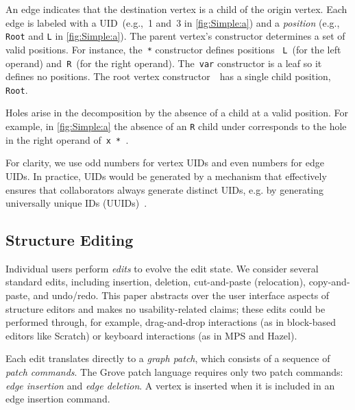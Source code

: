 An edge indicates that the destination vertex is a child of the origin vertex. 
Each edge is labeled with a UID~(e.g.,~1 and~3 in \autoref{fig:Simple:a})
and a \emph{position} (e.g., \texttt{Root} and \texttt{L} in \autoref{fig:Simple:a}). 
The parent vertex's constructor determines a set of valid {positions}. 
For instance, the~\texttt{*} constructor defines positions
~\texttt{L}~(for the left operand)
and~\texttt{R}~(for the right operand).
The~\texttt{var} constructor is a leaf so it defines no positions.
The root vertex constructor~\textbullet~has a single child position, \texttt{Root}.


Holes arise in the decomposition by the absence of a child at a valid position.
For example, in \autoref{fig:Simple:a} the absence of an \texttt{R} child under \vSimpleTimes{}
corresponds to the hole in the right operand of~\texttt{x * \hole}.

For clarity, we use odd numbers for vertex UIDs and even numbers for edge UIDs. In practice, UIDs would be generated by a mechanism
that effectively ensures that collaborators always generate distinct UIDs, e.g. by generating
universally unique IDs (UUIDs)~\cite{paskin1999toward}.


\subsection{Structure Editing}%
\label{sub:Single-User Actions}
\figureWrapMove

Individual users perform \emph{edits} to evolve the edit state. We consider several standard edits, including insertion, deletion, cut-and-paste (relocation), copy-and-paste, and undo/redo. This paper abstracts over the user interface aspects of structure editors and makes no usability-related claims; these edits could be performed through, for example, drag-and-drop interactions (as in block-based editors like Scratch) or keyboard interactions (as in MPS and Hazel).  %

Each edit translates directly to a \emph{graph patch}, which consists of a sequence of \emph{patch commands}. The Grove patch language requires only two patch commands:  \emph{edge insertion} and \emph{edge deletion}. A vertex is inserted when it is included in an edge insertion command.

